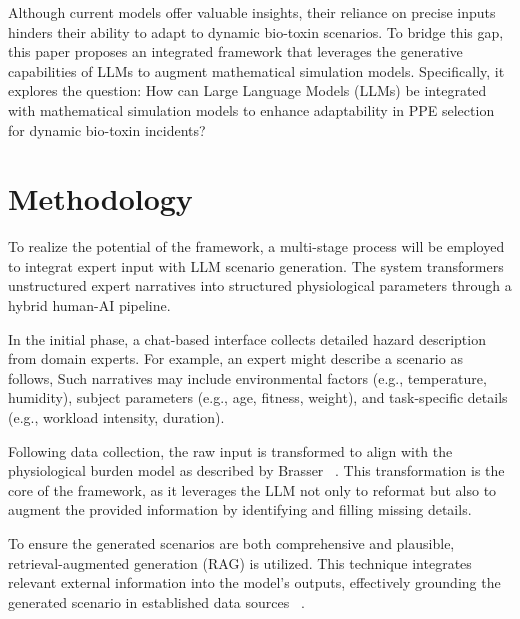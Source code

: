 \documentclass[stu]{apa7}
\begin{document}
    Although current models offer valuable insights, their reliance on precise inputs
    hinders their ability to adapt to dynamic bio-toxin scenarios.
    To bridge this gap, this paper proposes an integrated framework that leverages
    the generative capabilities of LLMs to augment mathematical simulation models.
    Specifically, it explores the question: How can Large Language Models (LLMs) be
    integrated with mathematical simulation models to enhance adaptability
    in PPE selection for dynamic bio-toxin incidents?

    \section{Methodology}\label{sec:methodology}
    To realize the potential of the framework, a multi-stage process will be employed
    to integrat expert input with LLM scenario generation.
    The system transformers unstructured expert narratives into structured
    physiological parameters through a hybrid human-AI pipeline.

    In the initial phase, a chat-based interface collects detailed hazard description
    from domain experts.
    For example, an expert might describe a scenario as follows, 
    Such narratives may include environmental factors (e.g., temperature, humidity),
    subject parameters (e.g., age, fitness, weight), and task-specific details (e.g.,
    workload intensity, duration).

    Following data collection, the raw input is transformed to align with the
    physiological burden model as described by Brasser ~\cite{brasser2023scenario}.
    This transformation is the core of the framework, as it leverages the LLM not only
    to reformat but also to augment the provided information by identifying and
    filling missing details.

    To ensure the generated scenarios are both comprehensive and plausible,
    retrieval-augmented generation (RAG) is utilized.
    This technique integrates relevant external information into the model's outputs, effectively grounding the
    generated scenario in established data sources
    ~\cite{lewis2021retrievalaugmentedgenerationknowledgeintensivenlp}.
\end{document}
